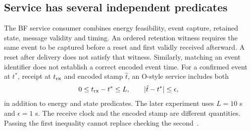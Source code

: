 \subsection{Service has several independent predicates}
The BF service consumer combines energy feasibility, event capture, retained
state, message validity and timing. An ordered retention witness requires
the same event to be captured before a reset and first validly received
afterward. A reset after delivery does not satisfy that witness. Similarly,
matching an event identifier does not establish a correct encoded event time.
For a confirmed event at $t^*$, receipt at $t_{\rm rx}$ and encoded stamp
$\hat t$, an O-style service includes both
\begin{equation}
 0\leq t_{\rm rx}-t^*\leq L,
 \qquad |\hat t-t^*|\leq\epsilon,
 \label{eq:time}
\end{equation}
in addition to energy and state predicates. The later experiment uses
$L=10$ s and $\epsilon=1$ s. The receive clock and the encoded stamp are
different quantities. Passing the first inequality cannot replace checking
the second~\cite{otask,final}.
